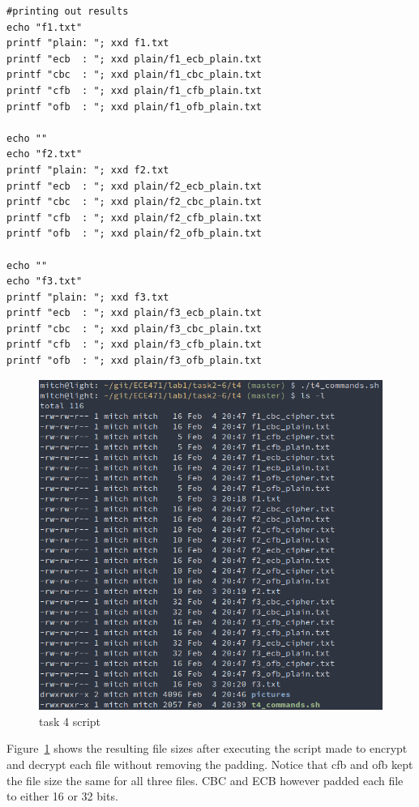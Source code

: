 \documentclass[12pt]{article}
\begin{document}
\begin{verbatim}
#printing out results
echo "f1.txt"
printf "plain: "; xxd f1.txt
printf "ecb  : "; xxd plain/f1_ecb_plain.txt
printf "cbc  : "; xxd plain/f1_cbc_plain.txt
printf "cfb  : "; xxd plain/f1_cfb_plain.txt
printf "ofb  : "; xxd plain/f1_ofb_plain.txt

echo ""
echo "f2.txt"
printf "plain: "; xxd f2.txt
printf "ecb  : "; xxd plain/f2_ecb_plain.txt
printf "cbc  : "; xxd plain/f2_cbc_plain.txt
printf "cfb  : "; xxd plain/f2_cfb_plain.txt
printf "ofb  : "; xxd plain/f2_ofb_plain.txt

echo ""
echo "f3.txt"
printf "plain: "; xxd f3.txt
printf "ecb  : "; xxd plain/f3_ecb_plain.txt
printf "cbc  : "; xxd plain/f3_cbc_plain.txt
printf "cfb  : "; xxd plain/f3_cfb_plain.txt
printf "ofb  : "; xxd plain/f3_ofb_plain.txt

\end{verbatim}

\begin{figure}[H]
    \begin{center}
        \includegraphics[scale=0.55]{t4p2.png}
    \end{center}{}
    \caption{task 4 script}
    \label{fig:t4p2}
\end{figure}

Figure~\ref{fig:t4p2} shows the resulting file sizes after executing the script made to encrypt and decrypt each file without removing the padding. Notice that cfb and ofb kept the file size the same for all three files. CBC and ECB however padded each file to either 16 or 32 bits.
\end{document}
